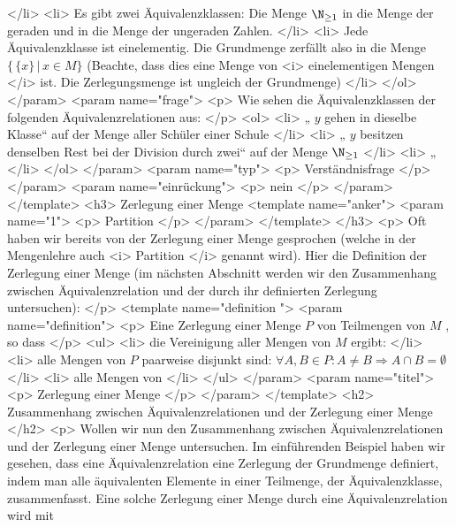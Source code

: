      </li>
     <li>
      Es gibt zwei Äquivalenzklassen: Die Menge
      $\N_{\ge1}$
      in die Menge der geraden und in die Menge der ungeraden Zahlen.
     </li>
     <li>
      Jede Äquivalenzklasse ist einelementig. Die Grundmenge zerfällt also in die Menge
      $\{\,\{x\}\,|\,x\in M\}$
      (Beachte, dass dies eine Menge von
      <i>
       einelementigen Mengen
      </i>
      ist. Die Zerlegungsmenge ist ungleich der Grundmenge)
     </li>
    </ol>
   </param>
   <param name="frage">
    <p>
     Wie sehen die Äquivalenzklassen der folgenden Äquivalenzrelationen aus:
    </p>
    <ol>
     <li>
      „
      $y$
      gehen in dieselbe Klasse“ auf der Menge aller Schüler einer Schule
     </li>
     <li>
      „
      $y$
      besitzen denselben Rest bei der Division durch zwei“ auf der Menge
      $\N_{\ge1}$
     </li>
     <li>
      „
     </li>
    </ol>
   </param>
   <param name="typ">
    <p>
     Verständnisfrage
    </p>
   </param>
   <param name="einrückung">
    <p>
     nein
    </p>
   </param>
  </template>
  <h3>
   Zerlegung einer Menge
   <template name="anker">
    <param name="1">
     <p>
      Partition
     </p>
    </param>
   </template>
  </h3>
  <p>
   Oft haben wir bereits von der Zerlegung einer Menge gesprochen (welche in der Mengenlehre auch
   <i>
    Partition
   </i>
   genannt wird). Hier die Definition der Zerlegung einer Menge (im nächsten Abschnitt werden wir den Zusammenhang zwischen Äquivalenzrelation und der durch ihr definierten Zerlegung untersuchen):
  </p>
  <template name="definition
 ">
   <param name="definition">
    <p>
     Eine Zerlegung einer Menge
     $P$
     von Teilmengen von
     $M$
     , so dass
    </p>
    <ul>
     <li>
      die Vereinigung aller Mengen von
      $M$
      ergibt:
     </li>
     <li>
      alle Mengen von
      $P$
      paarweise disjunkt sind:
      $\forall A, B\in P: A\ne B \Rightarrow A \cap B = \emptyset$
     </li>
     <li>
      alle Mengen von
     </li>
    </ul>
   </param>
   <param name="titel">
    <p>
     Zerlegung einer Menge
    </p>
   </param>
  </template>
  <h2>
   Zusammenhang zwischen Äquivalenzrelationen und der Zerlegung einer Menge
  </h2>
  <p>
   Wollen wir nun den Zusammenhang zwischen Äquivalenzrelationen und der Zerlegung einer Menge untersuchen. Im einführenden Beispiel haben wir gesehen, dass eine Äquivalenzrelation eine Zerlegung der Grundmenge definiert, indem man alle äquivalenten Elemente in einer Teilmenge, der Äquivalenzklasse, zusammenfasst. Eine solche Zerlegung einer Menge durch eine Äquivalenzrelation wird mit
